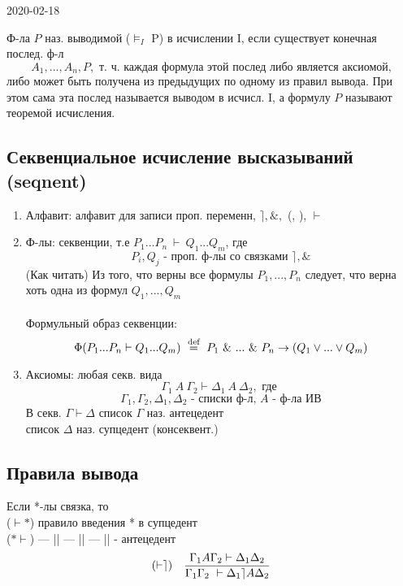 \documentclass[12pt, fleqn]{article}
\begin{document}
\begin{lect} {2020-02-18}
    \begin{definition}
        Ф-ла $P$ наз. выводимой ($\vDash_I$ P) в исчислении I, если существует конечная послед. ф-л 
        \[A_1, ..., A_n, P, \text{ т. ч. каждая формула этой послед либо является аксиомой,}\]
        либо может быть получена из предыдущих по одному из правил вывода.
        При этом сама эта послед называется выводом в исчисл. I, а формулу $P$ называют теоремой исчисления.
    \end{definition}

    \subsection{Секвенциальное исчисление высказываний (seqnent)}

    \begin{enumerate}
        \item Алфавит: \q алфавит для записи проп. переменн, $\rceil, \&, $ (, ), $\vdash$
        \item Ф-лы: секвенции, т.е $P_1 ... P_n \ \vdash \ Q_1 ... Q_m$, где 
            \[P_i, Q_j \text{ - проп. ф-лы со связками } \rceil, \&\]
        (Как читать) \q Из того, что верны все формулы $P_1, ..., P_n$ следует, что верна хоть одна из формул 
        $Q_1, ..., Q_m$\\    \\
        Формульный образ секвенции: 
        \[\Phi(P_1 ... P_n \vdash Q_1 ... Q_m) \ \os{\text{def}}{=}\ P_1 \  \&\ ...\ \&\ P_n \to 
        (Q_1 \vee ... \vee Q_m)\]
        \item Аксиомы: любая секв. вида 
            \[\Gamma_1\ A\ \Gamma_2 \vdash \Delta_1 \ A \ \Delta_2, \text{ где } \]
            \[\Gamma_1, \Gamma_2, \Delta_1, \Delta_2 \text{ - списки ф-л,  } A \text{ - ф-ла ИВ}\]
            В секв. $\Gamma \vdash \Delta$ список $\Gamma$ наз. антецедент\\
            список $\Delta$ наз. супцедент (консеквент.)
    \end{enumerate}
    
    \subsection{Правила вывода}

    Если *-лы связка, то \\
    ($\vdash *$) правило введения * в супцедент\\
    ($*\vdash$) --- || --- || --- || - антецедент
    \[(\vdash \rceil) \quad \frac{\Gamma_1 A \Gamma_2 \vdash \Delta_1 \Delta_2}
    {\Gamma_1 \Gamma_2 \ \vdash \Delta_1 \rceil A \Delta_2}\]
    

\end{lect}
\end{document}
